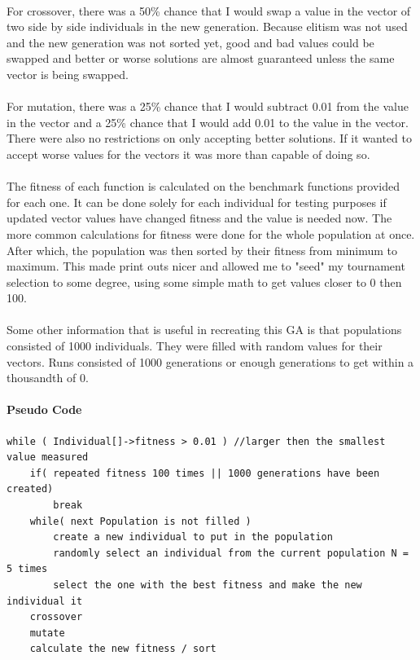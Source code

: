 \documentclass[paper=a4, fontsize=11pt]{scrartcl} %
\numberwithin{equation}{section} %
\numberwithin{figure}{section} %
\numberwithin{table}{section} %
\begin{document}
\paragraph{} For crossover, there was a 50\% chance that I would swap a value in the vector of two side by side individuals in the new generation. Because elitism was not used and the new generation was not sorted yet, good and bad values could be swapped and better or worse solutions are almost guaranteed unless the same vector is being swapped.

\paragraph{} For mutation, there was a 25\% chance that I would subtract 0.01 from the value in the vector and a 25\% chance that I would add 0.01 to the value in the vector. There were also no restrictions on only accepting better solutions. If it wanted to accept worse values for the vectors it was more than capable of doing so.

\paragraph{} The fitness of each function is calculated on the benchmark functions provided for each one. It can be done solely for each individual for testing purposes if updated vector values have changed fitness and the value is needed now. The more common calculations for fitness were done for the whole population at once. After which, the population was then sorted by their fitness from minimum to maximum. This made print outs nicer and allowed me to "seed" my tournament selection to some degree, using some simple math to get values closer to 0 then 100.

\paragraph{} Some other information that is useful in recreating this GA is that populations consisted of 1000 individuals. They were filled with random values for their vectors. Runs consisted of 1000 generations or enough generations to get within a thousandth of 0.

\paragraph{Pseudo Code}
\begin{verbatim}
while ( Individual[]->fitness > 0.01 ) //larger then the smallest value measured
    if( repeated fitness 100 times || 1000 generations have been created)
        break
    while( next Population is not filled )
        create a new individual to put in the population
        randomly select an individual from the current population N = 5 times
        select the one with the best fitness and make the new individual it
    crossover
    mutate
    calculate the new fitness / sort
\end{verbatim}
\end{document}
